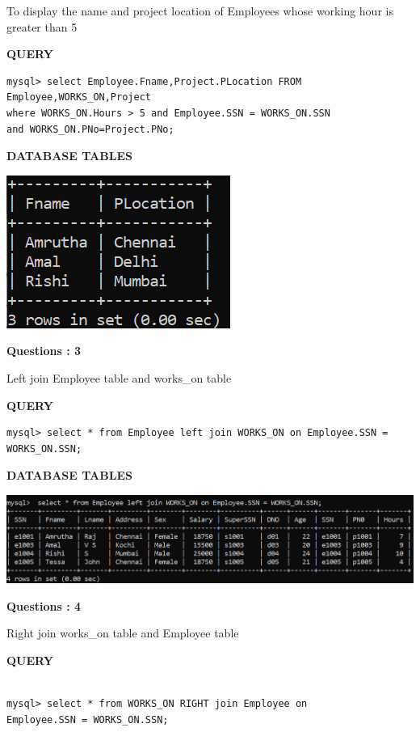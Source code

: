 \documentclass[a4paper,12pt]{report}
\begin{document}
To display the name and project location of Employees whose working hour is greater than 5
	\begin{flushleft}
		\textbf{QUERY }
	\end{flushleft}
 \begin{verbatim}
mysql> select Employee.Fname,Project.PLocation FROM Employee,WORKS_ON,Project 
where WORKS_ON.Hours > 5 and Employee.SSN = WORKS_ON.SSN 
and WORKS_ON.PNo=Project.PNo;
 \end{verbatim}
\begin{flushleft}
		\textbf{DATABASE TABLES} 
\end{flushleft} 
\includegraphics[scale=0.7]{Screenshot (473).png}
\begin{flushleft}
    \textbf{Questions : 3}
\end{flushleft}
Left join Employee table and works\_on table
	\begin{flushleft}
		\textbf{QUERY }
	\end{flushleft}
 \begin{verbatim}
mysql> select * from Employee left join WORKS_ON on Employee.SSN = WORKS_ON.SSN;
 \end{verbatim}
\begin{flushleft}
		\textbf{DATABASE TABLES} 
\end{flushleft} 

\includegraphics[scale=0.4]{Screenshot (474).png}
\begin{flushleft}
    \textbf{Questions : 4}
\end{flushleft}
Right join works\_on table and Employee table
	\begin{flushleft}
		\textbf{QUERY }
	\end{flushleft}
 \begin{verbatim}
 
mysql> select * from WORKS_ON RIGHT join Employee on 
Employee.SSN = WORKS_ON.SSN;

 \end{verbatim}
 
\end{document}
